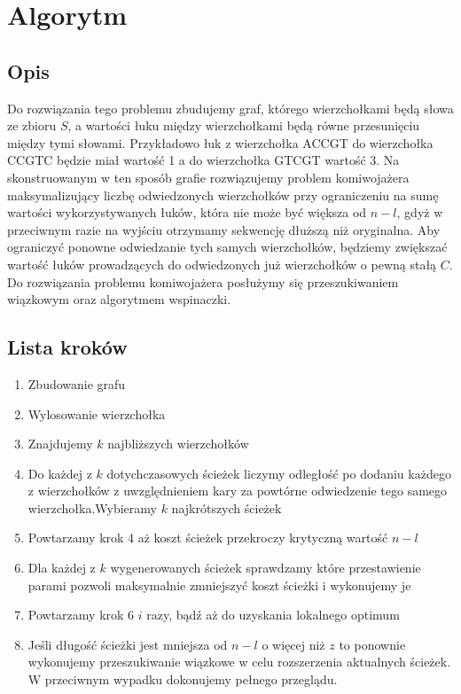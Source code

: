 \documentclass{article}
\begin{document}
\section{Algorytm}
\subsection{Opis}
Do rozwiązania tego problemu zbudujemy graf, którego wierzchołkami będą słowa ze zbioru $S$, a wartości łuku między wierzchołkami będą równe przesunięciu między tymi słowami. Przykładowo łuk z wierzchołka ACCGT do wierzchołka CCGTC będzie miał wartość 1 a do wierzchołka GTCGT wartość 3. Na skonstruowanym w ten sposób grafie rozwiązujemy problem komiwojażera maksymalizujący liczbę odwiedzonych wierzchołków przy ograniczeniu na sumę wartości wykorzystywanych łuków, która nie może być większa od $n - l$, gdyż w przeciwnym razie na wyjściu otrzymamy sekwencję dłuższą niż oryginalna.
Aby ograniczyć ponowne odwiedzanie tych samych wierzchołków, będziemy zwiększać wartość łuków prowadzących do odwiedzonych już wierzchołków o pewną stałą $C$.
Do rozwiązania problemu komiwojażera posłużymy się przeszukiwaniem wiązkowym oraz algorytmem wspinaczki.
\subsection{Lista kroków}
\begin{enumerate}
    \item Zbudowanie grafu
    \item Wylosowanie wierzchołka %
    \item Znajdujemy $k$ najbliższych wierzchołków
    \item Do każdej z $k$ dotychczasowych ścieżek liczymy odległość po dodaniu każdego z wierzchołków z uwzględnieniem kary za powtórne odwiedzenie tego samego wierzchołka.Wybieramy $k$ najkrótszych ścieżek
    \item Powtarzamy krok 4 aż koszt ścieżek przekroczy krytyczną wartość $n-l$
    \item Dla każdej z $k$ wygenerowanych ścieżek sprawdzamy które przestawienie parami pozwoli maksymalnie zmniejszyć koszt ścieżki i wykonujemy je
    \item Powtarzamy krok 6 $i$ razy, bądź aż do uzyskania lokalnego optimum
    \item Jeśli długość ścieżki jest mniejsza od $n-l$ o więcej niż $z$ to ponownie wykonujemy przeszukiwanie wiązkowe w celu rozszerzenia aktualnych ścieżek. W przeciwnym wypadku dokonujemy pełnego przeglądu.
\end{enumerate}
\end{document}

